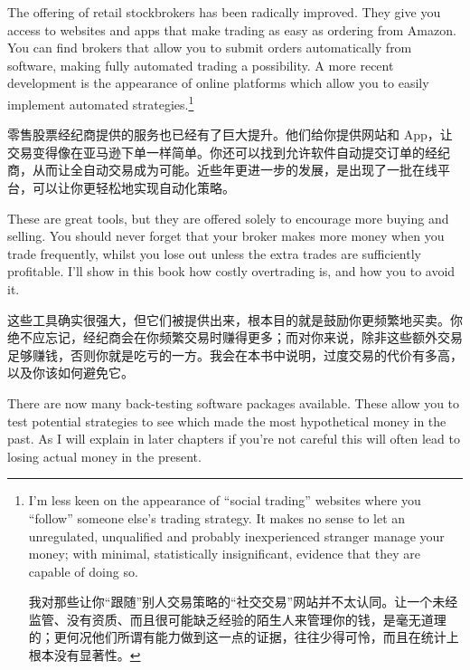 \begin{englishblock} The offering of retail stockbrokers has been radically improved. They give you access to websites and apps that make trading as easy as ordering from Amazon. You can find brokers that allow you to submit orders automatically from software, making fully automated trading a possibility. A more recent development is the appearance of online platforms which allow you to easily implement automated strategies.\footnote{I'm less keen on the appearance of ``social trading'' websites where you ``follow'' someone else's trading strategy. It makes no sense to let an unregulated, unqualified and probably inexperienced stranger manage your money; with minimal, statistically insignificant, evidence that they are capable of doing so. \par 我对那些让你“跟随”别人交易策略的“社交交易”网站并不太认同。让一个未经监管、没有资质、而且很可能缺乏经验的陌生人来管理你的钱，是毫无道理的；更何况他们所谓有能力做到这一点的证据，往往少得可怜，而且在统计上根本没有显著性。}\end{englishblock}

\begin{chineseblock}零售股票经纪商提供的服务也已经有了巨大提升。他们给你提供网站和 App，让交易变得像在亚马逊下单一样简单。你还可以找到允许软件自动提交订单的经纪商，从而让全自动交易成为可能。近些年更进一步的发展，是出现了一批在线平台，可以让你更轻松地实现自动化策略。\end{chineseblock}

\bipairgap

\begin{englishblock} These are great tools, but they are offered solely to encourage more buying and selling. You should never forget that your broker makes more money when you trade frequently, whilst you lose out unless the extra trades are sufficiently profitable. I'll show in this book how costly overtrading is, and how you to avoid it. \end{englishblock}

\begin{chineseblock}这些工具确实很强大，但它们被提供出来，根本目的就是鼓励你更频繁地买卖。你绝不应忘记，经纪商会在你频繁交易时赚得更多；而对你来说，除非这些额外交易足够赚钱，否则你就是吃亏的一方。我会在本书中说明，过度交易的代价有多高，以及你该如何避免它。\end{chineseblock}

\bipairgap

\begin{englishblock} There are now many back-testing software packages available. These allow you to test potential strategies to see which made the most hypothetical money in the past. As I will explain in later chapters if you're not careful this will often lead to losing actual money in the present. \end{englishblock}

